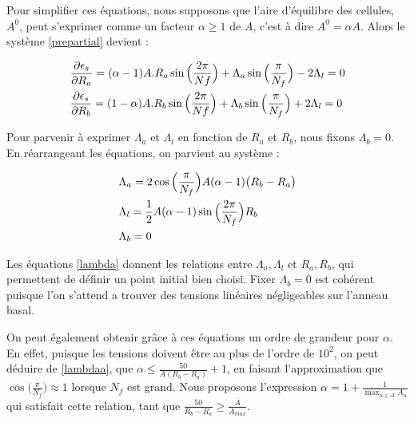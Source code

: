 \documentclass[11pt,a4paper]{article}
\begin{document}
Pour simplifier ces équations, nous supposons que l'aire d'équilibre des cellules, $A^0$, peut s'exprimer comme un facteur $\alpha \ge 1$ de $A$, c'est à dire $A^0=\alpha A$. Alors le système \eqref{prepartial} devient :

\begin{subequations}{\label{partial}}
    \begin{align}
            &\frac{\partial \epsilon_s}{\partial R_a} = (\alpha-1)A.R_a\sin\Big(\frac{2\pi}{Nf}\Big)+\Lambda_a
            \sin\Big(\frac{\pi}{N_f}\Big)-2\Lambda_l = 0\label{partialA}\\
            &\frac{\partial \epsilon_s}{\partial R_b} = (1-\alpha)A.R_b\sin\Big(\frac{2\pi}{Nf}\Big)+\Lambda_b \sin\Big(\frac{\pi}{N_f}\Big)+2\Lambda_l = 0\label{partialB}
    \end{align}
\end{subequations}

Pour parvenir à exprimer $\Lambda_a$ et $\Lambda_l$ en fonction de $R_a$ et $R_b$, nous fixons $\Lambda_b = 0$. En réarrangeant les équations, on parvient au système :

\begin{subequations}{\label{lambda}}
    \begin{align}
            &\Lambda_a = 2\cos\Big(\frac{\pi}{N_f}\Big)A(\alpha-1)\big(R_b-R_a\big)\label{lambdaa}\\
            &\Lambda_l = \frac{1}{2}A(\alpha-1)\sin\Big(\frac{2\pi}{N_f}\Big)R_b\label{lambdal}\\
            &\Lambda_b = 0\label{lambdab}
    \end{align}
\end{subequations}

Les équations \eqref{lambda} donnent les relations entre $\Lambda_a, \Lambda_l$ et $R_a, R_b$, qui permettent de définir un point initial bien choisi. Fixer $\Lambda_b = 0$ est cohérent puisque l'on s'attend a trouver des tensions linéaires négligeables sur l'anneau basal.  

On peut également obtenir grâce à ces équations un ordre de grandeur pour $\alpha$. En effet, puisque les tensions doivent être au plus de l'ordre de $10^2$, on peut déduire de \eqref{lambdaa}, que $\alpha \le \frac{50}{A(R_b-R_a)}+1$, en faisant l'approximation que $ \cos\Big(\frac{\pi}{N_f}\Big) \approx 1$ lorsque $N_f$ est grand. Nous proposons l'expression $\alpha = 1 + \frac{1}{\max_{\alpha \in \mathcal{A}}A_\alpha}$ qui satisfait cette relation, tant que $\frac{50}{R_b-R_a}\ge \frac{\overline{A}}{A_{max}}$.
\end{document}
